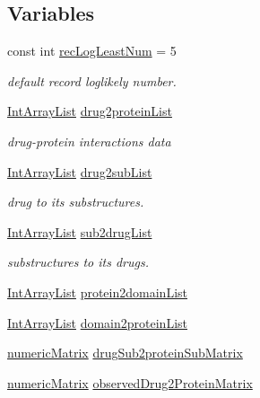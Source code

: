 \subsection*{Variables}
\begin{DoxyCompactItemize}
\item 
const int \hyperlink{namespacegift_ab632fcb7ab144fdde38c5a4154e2b5b7}{rec\+Log\+Least\+Num} = 5
\begin{DoxyCompactList}\small\item\em default record loglikely number. \end{DoxyCompactList}\item 
\hyperlink{namespacegift_a98b589c33d80e413fceaf8afd8e25815}{Int\+Array\+List} \hyperlink{namespacegift_a2c0005015565d7432dd64fd6bafd3395}{drug2protein\+List}
\begin{DoxyCompactList}\small\item\em drug-\/protein interactions data \end{DoxyCompactList}\item 
\hyperlink{namespacegift_a98b589c33d80e413fceaf8afd8e25815}{Int\+Array\+List} \hyperlink{namespacegift_a73506f6b6bc3e6f6fedfacf8bf0d38f1}{drug2sub\+List}
\begin{DoxyCompactList}\small\item\em drug to its substructures. \end{DoxyCompactList}\item 
\hyperlink{namespacegift_a98b589c33d80e413fceaf8afd8e25815}{Int\+Array\+List} \hyperlink{namespacegift_afcc3e6429fa4fef47fb34e30d2f0c6c4}{sub2drug\+List}
\begin{DoxyCompactList}\small\item\em substructures to its drugs. \end{DoxyCompactList}\item 
\hyperlink{namespacegift_a98b589c33d80e413fceaf8afd8e25815}{Int\+Array\+List} \hyperlink{namespacegift_aa113a7a90b1c3c70d1ab252eb34816fe}{protein2domain\+List}
\item 
\hyperlink{namespacegift_a98b589c33d80e413fceaf8afd8e25815}{Int\+Array\+List} \hyperlink{namespacegift_ac99bcb1b736637f97e82be7503c725b5}{domain2protein\+List}
\item 
\hyperlink{namespacegift_a4e11987023733fe14bdabd0b52e78583}{numeric\+Matrix} \hyperlink{namespacegift_ae49d782c144d39543cd6504f5e7d9c7a}{drug\+Sub2protein\+Sub\+Matrix}
\item 
\hyperlink{namespacegift_a4e11987023733fe14bdabd0b52e78583}{numeric\+Matrix} \hyperlink{namespacegift_ad84dd6f05c58f2f2061db7ab70bd5471}{observed\+Drug2\+Protein\+Matrix}

\end{DoxyCompactItemize}
